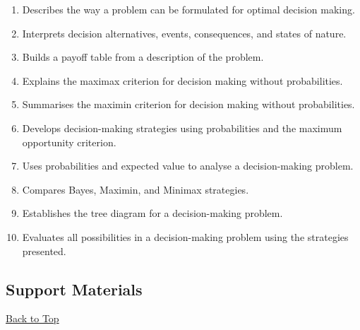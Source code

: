\begin{enumerate}
	\item Describes the way a problem can be formulated for optimal decision making.
	\item Interprets decision alternatives, events, consequences, and states of nature.
	\item Builds a payoff table from a description of the problem.
	\item Explains the maximax criterion for decision making without probabilities.
	\item Summarises the maximin criterion for decision making without probabilities.
	\item Develops decision-making strategies using probabilities and the maximum opportunity criterion.
	\item Uses probabilities and expected value to analyse a decision-making problem.
	\item Compares Bayes, Maximin, and Minimax strategies.
	\item Establishes the tree diagram for a decision-making problem.
	\item Evaluates all possibilities in a decision-making problem using the strategies presented.
\end{enumerate}

\subsection{Support Materials}\label{sec:grade10-analysis-support-materials}

\vspace{6pt}
\noindent\hyperref[table-of-contents]{Back to Top}

